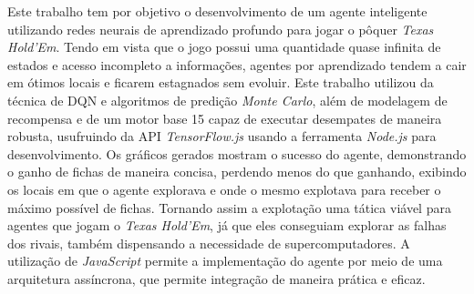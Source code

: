 
Este trabalho tem por objetivo o desenvolvimento de um agente inteligente utilizando redes neurais de aprendizado profundo para jogar o pôquer \textit{Texas Hold'Em}. Tendo em vista que o jogo possui uma quantidade quase infinita de estados e acesso incompleto a informações, agentes por aprendizado tendem a cair em ótimos locais e ficarem estagnados sem evoluir. Este trabalho utilizou da técnica de \gls{DQN} e algoritmos de predição \textit{Monte Carlo}, além de modelagem de recompensa e de um motor base 15 capaz de executar desempates de maneira robusta, usufruindo da \gls{API} \textit{TensorFlow.js} usando a ferramenta \textit{Node.js} para desenvolvimento. Os gráficos gerados mostram o sucesso do agente, demonstrando o ganho de fichas de maneira concisa, perdendo menos do que ganhando, exibindo os locais em que o agente explorava e onde o mesmo explotava para receber o máximo possível de fichas. Tornando assim a explotação uma tática viável para agentes que jogam o \textit{Texas Hold'Em}, já que eles conseguiam explorar as falhas dos rivais, também dispensando a necessidade de supercomputadores. A utilização de \textit{JavaScript} permite a implementação do agente por meio de uma arquitetura assíncrona, que permite integração de maneira prática e eficaz.

